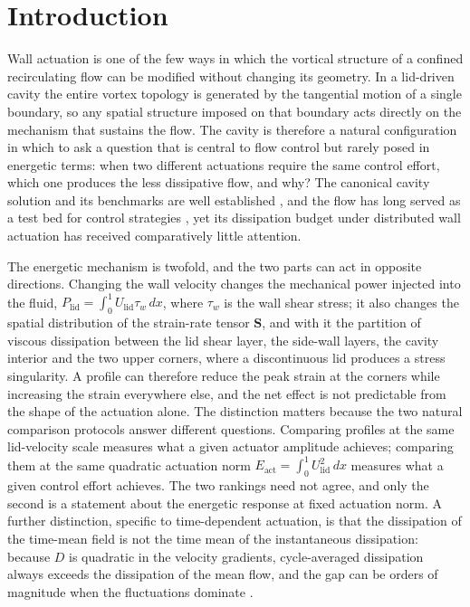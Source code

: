 \documentclass[11pt,a4paper]{article}
\newcommand{\Eact}{E_{\mathrm{act}}}
\newcommand{\Plid}{P_{\mathrm{lid}}}
\newcommand{\Sij}{\mathbf{S}}
\newenvironment{chgdel}{\par\color{red}}{\par\color{black}}
\begin{document}
\section{Introduction}

\begin{chgdel}
Wall actuation is one of the few ways in which the vortical structure of a
confined recirculating flow can be modified without changing its geometry. In a
lid-driven cavity the entire vortex topology is generated by the tangential
motion of a single boundary, so any spatial structure imposed on that boundary
acts directly on the mechanism that sustains the flow. The cavity is therefore a
natural configuration in which to ask a question that is central to flow control
but rarely posed in energetic terms: when two different actuations require the
same control effort, which one produces the less dissipative flow, and why?
The canonical cavity solution and its benchmarks are well established
,
and the flow has long served as a test bed for control strategies
, yet its dissipation budget under
distributed wall actuation has received comparatively little attention.

The energetic mechanism is twofold, and the two parts can act in opposite
directions. Changing the wall velocity changes the mechanical power injected into
the fluid,
$\Plid=\int_0^1 U_{\mathrm{lid}}\tau_w\,dx$, where $\tau_w$ is the wall shear
stress; it also changes the spatial distribution of the strain-rate tensor
$\Sij$, and with it the partition of viscous dissipation between the lid shear
layer, the side-wall layers, the cavity interior and the two upper corners, where
a discontinuous lid produces a stress singularity. A profile can therefore reduce
the peak strain at the corners while increasing the strain everywhere else, and
the net effect is not predictable from the shape of the actuation alone. The
distinction matters because the two natural comparison protocols answer different
questions. Comparing profiles at the same lid-velocity scale
 measures what a given actuator amplitude achieves; comparing
them at the same quadratic actuation norm
$\Eact=\int_0^1U_{\mathrm{lid}}^2\,dx$ measures what a given control effort
achieves. The two rankings need not agree, and only the second is a statement
about the energetic response at fixed actuation norm. A further distinction, specific to time-dependent actuation, is
that the dissipation of the time-mean field is not the time mean of the
instantaneous dissipation: because $D$ is quadratic in the velocity gradients,
cycle-averaged dissipation always exceeds the dissipation of the mean flow, and
the gap can be orders of magnitude when the fluctuations dominate
.


\end{chgdel}
\end{document}

